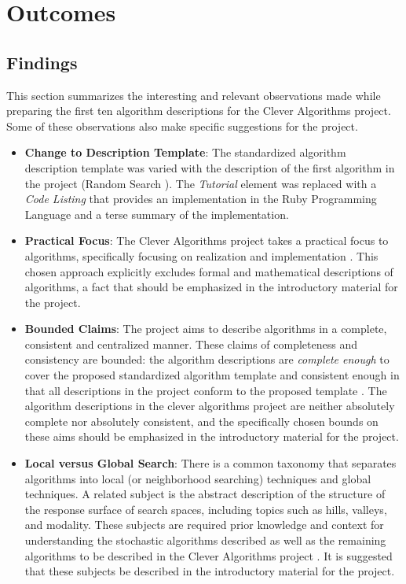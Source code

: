 \documentclass[a4paper, 11pt]{article}
\begin{document}
% 
% 
\section{Outcomes}
\label{sec:outcomes}

% 
% 
\subsection{Findings}
This section summarizes the interesting and relevant observations made while preparing the first ten algorithm descriptions for the Clever Algorithms project. Some of these observations also make specific suggestions for the project. 

\begin{itemize}
	\item \textbf{Change to Description Template}: The standardized algorithm description template \cite{Brownlee2010a} was varied with the description of the first algorithm in the project (Random Search \cite{Brownlee2010g}). The \emph{Tutorial} element was replaced with a \emph{Code Listing} that provides an implementation in the Ruby Programming Language and a terse summary of the implementation. 	
	\item \textbf{Practical Focus}: The Clever Algorithms project takes a practical focus to algorithms, specifically focusing on realization and implementation \cite{Brownlee2010g}. This chosen approach explicitly excludes formal and mathematical descriptions of algorithms, a fact that should be emphasized in the introductory material for the project. 
	\item \textbf{Bounded Claims}: The project aims to describe algorithms in a complete, consistent and centralized manner. These claims of completeness and consistency are bounded: the algorithm descriptions are \emph{complete enough} to cover the proposed standardized algorithm template and consistent enough in that all descriptions in the project conform to the proposed template \cite{Brownlee2010g}. The algorithm descriptions in the clever algorithms project are neither absolutely complete nor absolutely consistent, and the specifically chosen bounds on these aims should be emphasized in the introductory material for the project.
	\item \textbf{Local versus Global Search}: There is a common taxonomy that separates algorithms into local (or neighborhood searching) techniques and global techniques. A related subject is the abstract description of the structure of the response surface of search spaces, including topics such as hills, valleys, and modality. These subjects are required prior knowledge and context for understanding the stochastic algorithms described as well as the remaining algorithms to be described in the Clever Algorithms project \cite{Brownlee2010h}. It is suggested that these subjects be described in the introductory material for the project.

\end{itemize}
\end{document}
